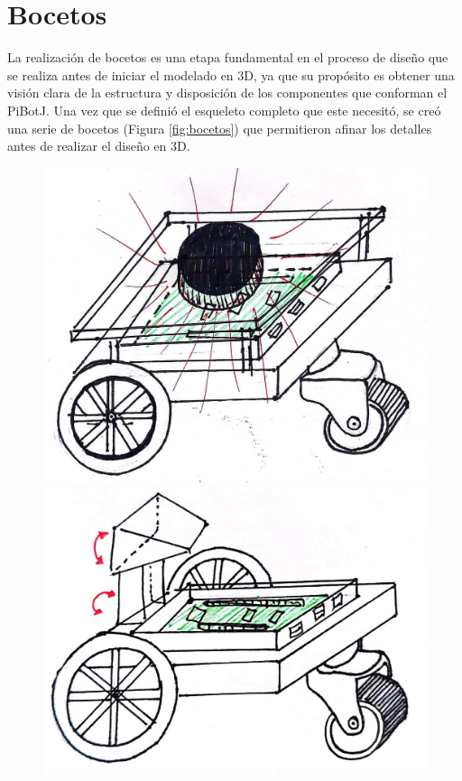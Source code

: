  
\section{Bocetos}

La realización de bocetos es una etapa fundamental en el proceso de diseño que se realiza antes de iniciar el modelado en 3D, ya que su propósito es obtener una visión clara de la estructura y disposición de los componentes que conforman el PiBotJ. Una vez que se definió el esqueleto completo que este necesitó, se creó una serie de bocetos (Figura \ref{fig:bocetos}) que permitieron afinar los detalles antes de realizar el diseño en 3D.

\begin{figure}[ht!]
	\centering
	\begin{minipage}{0.4\linewidth}
		\centering
		\includegraphics[width=\linewidth]{figs/cap5/prototipo_laser.jpeg}
	\end{minipage}
	\hspace{2cm}
	\begin{minipage}{0.4\linewidth}
		\centering
		\includegraphics[width=\linewidth]{figs/cap5/prototipo_sin_laser.jpeg}

\end{minipage}
\end{figure}
